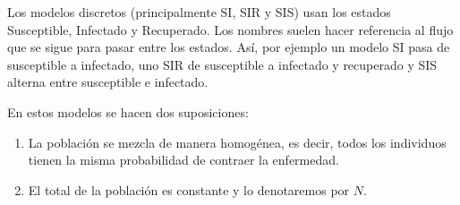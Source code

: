 Los modelos discretos (principalmente SI, SIR y SIS) usan los estados Susceptible, Infectado y Recuperado. Los nombres suelen hacer referencia al flujo que se sigue para pasar entre los estados. Así, por ejemplo un modelo SI pasa de susceptible a infectado, uno SIR de susceptible a infectado y recuperado y SIS alterna entre susceptible e infectado.

En estos modelos se hacen dos suposiciones:
\begin{enumerate}
\item La población se mezcla de manera homogénea, es decir, todos los individuos tienen la misma probabilidad de contraer la enfermedad.
\item El total de la población es constante y lo denotaremos por $N$.
\end{enumerate}

